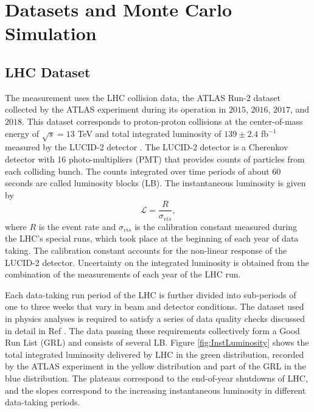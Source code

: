 \section{Datasets and Monte Carlo Simulation}
\label{sec:DataSetAndMonteCarlo}

\subsection{LHC Dataset}
\label{subsec:Dataset}

The measurement uses the LHC collision data, the ATLAS Run-$2$ dataset collected by the ATLAS experiment during its operation in $2015$, $2016$, $2017$, and $2018$. This dataset corresponds to proton-proton collisions at the center-of-mass energy of $\sqrt{s} = 13$ TeV and total integrated luminosity of $139 \pm 2.4$ fb$^{-1}$ measured by the LUCID-2 detector \cite{ATLASLuminosityDetector}\cite{ATLASRun2IntegratedLumi}. The LUCID-2 detector is a Cherenkov detector with 16 photo-multipliers (PMT) that provides counts of particles from each colliding bunch. The counts integrated over time periods of about $60$ seconds are called luminosity blocks (LB). The instantaneous luminosity is given by 
\begin{equation}
  \mathcal{L} = \frac{R}{\sigma_{vis}},
\end{equation}
where $R$ is the event rate and $\sigma_{vis}$ is the calibration constant measured during the LHC's special runs, which took place at the beginning of each year of data taking. The calibration constant accounts for the non-linear response of the LUCID-2 detector. Uncertainty on the integrated luminosity is obtained from the combination of the measurements of each year of the LHC run.

Each data-taking run period of the LHC is further divided into sub-periods of one to three weeks that vary in beam and detector conditions. The dataset used in physics analyses is required to satisfy a series of data quality checks discussed in detail in Ref \cite{ATLASRun2DataTaking}. The data passing these requirements collectively form a Good Run List (GRL) and consists of several LB. Figure \ref{fig:InstLuminosity} shows the total integrated luminosity delivered by LHC in the green distribution, recorded by the ATLAS experiment in the yellow distribution and part of the GRL in the blue distribution. The plateaus correspond to the end-of-year shutdowns of LHC, and the slopes correspond to the increasing instantaneous luminosity in different data-taking periods. 

